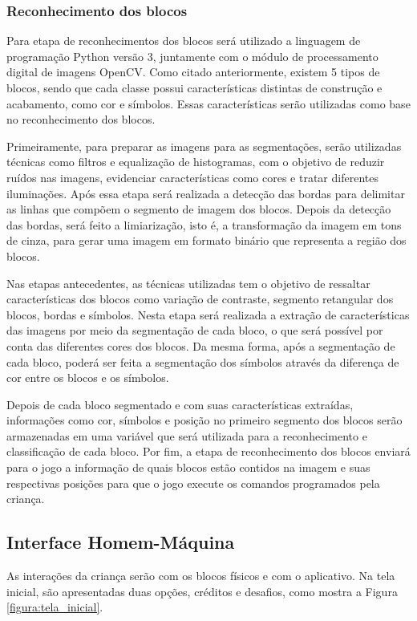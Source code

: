     \subsubsection{Reconhecimento dos blocos}
     
     Para etapa de reconhecimentos dos blocos será utilizado a linguagem de programação Python versão 3, juntamente com o módulo de processamento digital de imagens OpenCV.
 Como citado anteriormente, existem 5 tipos de blocos, sendo que cada classe possui características distintas de construção e acabamento, como cor e símbolos. Essas características serão utilizadas como base no reconhecimento dos blocos.
    
    Primeiramente, para preparar as imagens para as segmentações, serão utilizadas técnicas como filtros e equalização de histogramas, com o objetivo de reduzir ruídos nas imagens, evidenciar características como cores e tratar diferentes iluminações. 
    Após essa etapa será realizada a detecção das bordas para delimitar as linhas que compõem o segmento de imagem dos blocos. Depois da detecção das bordas, será feito a limiarização, isto é, a transformação da imagem em tons de cinza, para gerar uma imagem em formato binário que representa a região dos blocos.  
    
    Nas etapas antecedentes, as técnicas utilizadas tem o objetivo de ressaltar características dos blocos como variação de contraste, segmento retangular dos blocos, bordas e símbolos. Nesta etapa  será realizada a extração de características das imagens por meio da segmentação de cada bloco, o que será possível por conta das diferentes cores dos blocos. Da mesma forma, após a segmentação de cada bloco, poderá ser feita a segmentação dos símbolos através da diferença de cor entre os blocos e os símbolos.
    
	Depois de cada bloco segmentado e com suas características extraídas, informações como cor, símbolos e posição no primeiro segmento dos blocos serão armazenadas em uma variável que será utilizada para a reconhecimento e classificação de cada bloco.
	Por fim, a etapa de reconhecimento dos blocos enviará para o jogo a informação de quais blocos estão contidos na imagem e suas respectivas posições para que o jogo execute os comandos programados pela criança.

    
    
    \subsection{Interface Homem-Máquina}
    As interações da criança serão com os blocos físicos e com o aplicativo.
    Na tela inicial, são apresentadas duas opções, créditos e desafios, como mostra a Figura \ref{figura:tela_inicial}.
    

